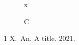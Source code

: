 \documentclass{cimart}
\begin{document}
\begin{figure}x\caption{C}\end{figure}
\begin{thebibliography}{1}
 X.~An. A title. 2021.
\end{thebibliography}
\end{document}

